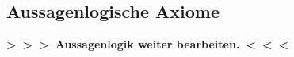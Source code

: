 \documentclass[english,ngerman,parskip=half,headsepline,footsepline,
	fleqn,notitlepage]{scrreprt}
\newcommand*{\defeq}{:=}%
\newcommand*{\limp}{\rightarrow}%
\newcommand*{\lnand}{\uparrow}%
\newcommand*{\lnor}{\downarrow}%
\newcommand*{\todo}[1]{\textbf{>~>~>~#1~<~<~<}}%
\begin{document}

	\subsection{Aussagenlogische Axiome}%
	\label{sub:ausAxiome}

\todo{Aussagenlogik weiter bearbeiten.}%
\end{document}
